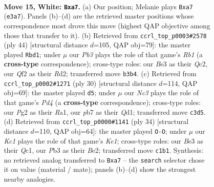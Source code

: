 \documentclass[11pt]{article}
\begin{document}
\clearpage

\begin{figure}[p]\centering
\begin{subfigure}{0.46\textwidth}\centering
\resizebox{\linewidth}{!}{%
\newchessgame
\chessboard[
  setfen={r3kb1r/pp1bpp1n/n2p2p1/qN5p/4P3/1PNBBP2/P1P2QPP/2K1R2R w kq - 1 15},
  showmover=false,
  pgfstyle=straightmove, color=movearrow, markmove={e3-a7}
]}
\caption{}
\end{subfigure}\hfill
\begin{subfigure}{0.46\textwidth}\centering
\resizebox{\linewidth}{!}{%
\newchessgame
\chessboard[
  setfen={r1b1r1k1/1p3pbp/2ppnnp1/8/1qPNP3/1PN1B1PP/2QR1PB1/1R4K1 w - - 11 23},
  showmover=false,
  pgfstyle=straightmove, color=movearrow, markmove={b1-d1}
]}
\caption{}
\end{subfigure}
\\[4pt]
\begin{subfigure}{0.46\textwidth}\centering
\resizebox{\linewidth}{!}{%
\newchessgame
\chessboard[
  setfen={r1b2r1k/bpp2p1n/2np3p/p5p1/2NPq3/1B3NB1/PP3PPP/R2Q1R1K w - - 0 16},
  showmover=false,
  pgfstyle=straightmove, color=movearrow, markmove={d4-d5}
]}
\caption{}
\end{subfigure}\hfill
\begin{subfigure}{0.46\textwidth}\centering
\resizebox{\linewidth}{!}{%
\newchessgame
\chessboard[
  setfen={r1b1r1k1/1p1n1pbn/p5p1/2pP3p/Pq2PB2/R1N2PN1/4B1PP/2Q1K2R w K - 2 18},
  showmover=false,
  pgfstyle=straightmove, color=movearrow, markmove={e1-g1}
]}
\caption{}
\end{subfigure}
\caption{\textbf{Move 15, White: \texttt{Bxa7}.} (a) Our position; Melanie plays \texttt{Bxa7} (\texttt{e3a7}). Panels (b)--(d) are the retrieved master positions whose correspondence most drove this move (highest QAP objective among those that transfer to it). (b) Retrieved from \texttt{ccrl\_top\_p0003\#2578} (ply 44) [structural distance $d$=105, QAP obj=79]: the master played \texttt{Rbd1}; under $\mu$ our \emph{Pb3} plays the role of that game's \emph{Rb1} (a \textbf{cross-type} correspondence); cross-type roles: our \emph{B}e3 as their \emph{Q}c2, our \emph{Q}f2 as their \emph{R}d2; transferred move \texttt{b3b4}. (c) Retrieved from \texttt{ccrl\_top\_p0002\#1271} (ply 30) [structural distance $d$=114, QAP obj=69]: the master played \texttt{d5}; under $\mu$ our \emph{Nc3} plays the role of that game's \emph{Pd4} (a \textbf{cross-type} correspondence); cross-type roles: our \emph{P}g2 as their \emph{R}a1, our \emph{p}b7 as their \emph{Q}d1; transferred move \texttt{c3d5}. (d) Retrieved from \texttt{ccrl\_top\_p0000\#1141} (ply 34) [structural distance $d$=110, QAP obj=64]: the master played \texttt{O-O}; under $\mu$ our \emph{Kc1} plays the role of that game's \emph{Ke1}; cross-type roles: our \emph{B}e3 as their \emph{Q}c1, our \emph{P}b3 as their \emph{B}e2; transferred move \texttt{c1b1}. Synthesis: no retrieved analog transferred to \texttt{Bxa7} -- the \texttt{search} selector chose it on value (material / mate); panels (b)--(d) show the strongest nearby analogies.}
\label{fig:thought-m28}
\end{figure}
\end{document}
